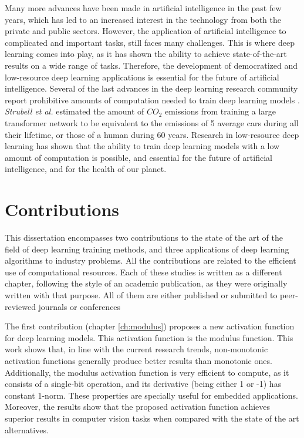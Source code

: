 Many more advances have been made in artificial intelligence in the past few years, which has led to an increased interest in the technology from both the private and public sectors. However, the application of artificial intelligence to complicated and important tasks, still faces many challenges. This is where deep learning comes into play, as it has shown the ability to achieve state-of-the-art results on a wide range of tasks. Therefore, the development of democratized and low-resource deep learning applications is essential for the future of artificial intelligence. Several of the last advances in the deep learning research community report prohibitive amounts of computation needed to train deep learning models \autocite{silver2016, kechyn2018, brown2020, floridi2020}. \textit{Strubell et al.} \autocite{strubell2019} estimated the amount of $CO_2$ emissions from training a large transformer network to be equivalent to the emissions of 5 average cars during all their lifetime, or those of a human during 60 years. Research in low-resource deep learning \autocite{howard2017, Han2017, Gao2018, sanchez2020, so2021} has shown that the ability to train deep learning models with a low amount of computation is possible, and essential for the future of artificial intelligence, and for the health of our planet.


\section{Contributions}
This dissertation encompasses two contributions to the state of the art of the field of deep learning training methods, and three applications of deep learning algorithms to industry problems. All the contributions are related to the efficient use of computational resources. Each of these studies is written as a different chapter, following the style of an academic publication, as they were originally written with that purpose. All of them are either published or submitted to peer-reviewed journals or conferences

The first contribution (chapter \ref{ch:modulus}) proposes a new activation function for deep learning models. This activation function is the modulus function. This work shows that, in line with the current research trends, non-monotonic activation functions generally produce better results than monotonic ones. Additionally, the modulus activation function is very efficient to compute, as it consists of a single-bit operation, and its derivative (being either 1 or -1) has constant 1-norm. These properties are specially useful for embedded applications. Moreover, the results show that the proposed activation function achieves superior results in computer vision tasks when compared with the state of the art alternatives.

